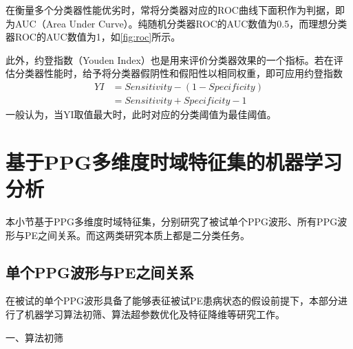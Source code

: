 在衡量多个分类器性能优劣时，常将分类器对应的ROC曲线下面积作为判据，即为AUC（Area Under Curve）。纯随机分类器ROC的AUC数值为0.5，而理想分类器ROC的AUC数值为1，如\autoref{fig:roc}所示。

此外，约登指数（Youden Index）也是用来评价分类器效果的一个指标。若在评估分类器性能时，给予将分类器假阴性和假阳性以相同权重，即可应用约登指数
\begin{equation}
      \label{equ:yi}
      \begin{aligned}
            YI&=Sensitivity-(1-Specificity)\\
            &=Sensitivity+Specificity-1
      \end{aligned}
\end{equation}
一般认为，当YI取值最大时，此时对应的分类阈值为最佳阈值\cite{cwl}。

\section{基于PPG多维度时域特征集的机器学习分析}
本小节基于PPG多维度时域特征集，分别研究了被试单个PPG波形、所有PPG波形与PE之间关系。而这两类研究本质上都是二分类任务。
\subsection{单个PPG波形与PE之间关系}
在被试的单个PPG波形具备了能够表征被试PE患病状态的假设前提下，本部分进行了机器学习算法初筛、算法超参数优化及特征降维等研究工作。

一、算法初筛


